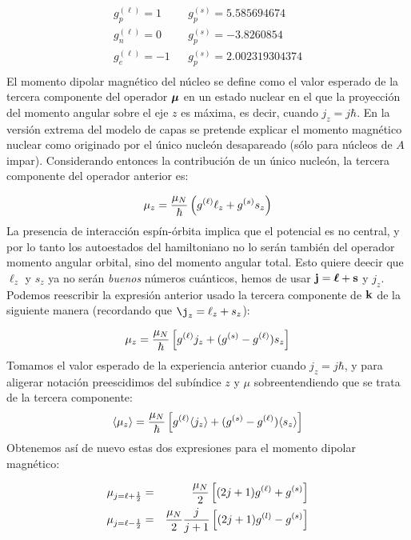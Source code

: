 \begin{eqnarray}
	g_p^{(\ell)} = 1 & & g_p^{(s)} = \num{5.585694674} \\
	g_n^{(\ell)} = 0 & & g_p^{(s)} = \num{-3.8260854} \\
	g_e^{(\ell)} = -1 & & g_p^{(s)} = \num{2.002319304374} \\
\end{eqnarray}
El momento dipolar magnético del núcleo se define como el valor esperado de la tercera componente del operador $\boldsymbol{\mu}$ en un estado nuclear en el que la proyección del momento angular sobre el eje $z$ es máxima, es decir, cuando $j_z=j\hbar$. En la versión extrema del modelo de capas se pretende explicar el momento magnético nuclear como originado por el único nucleón desapareado (sólo para núcleos de $A$ impar). Considerando entonces la contribución de un único nucleón, la tercera componente del operador anterior es:

\begin{eqnarray}
	\mu_z = \frac{\mu_N}{\hbar} \left( g^{(\ell)} \ell_z + g^{(s)} s_z \right)
\end{eqnarray}
La presencia de interacción espín-órbita implica que el potencial es no central, y por lo tanto los autoestados del hamiltoniano no lo serán también del operador momento angular orbital, sino del momento angular total. Esto quiere deecir que $\ell_z$ y $s_z$ ya no serán \textit{buenos} números cuánticos, hemos de usar $\mathbf{j}=\boldsymbol{\ell}+\mathbf{s}$ y $j_z$. Podemos reescribir la expresión anterior usado la tercera componente de $\mathbf{k}$ de la siguiente manera (recordando que $\j_z=\ell_z + s_z$):

\begin{eqnarray}
	\mu_z = \frac{\mu_N}{\hbar} \left[ g^{(\ell)}j_z + (g^{(s)}-g^{(\ell)})  s_z \right]
\end{eqnarray}
Tomamos el valor esperado de la experiencia anterior cuando $j_z=j\hbar$, y para aligerar notación preescidimos del subíndice $z$ y $\mu$ sobreentendiendo que se trata de la tercera componente:
\begin{eqnarray}
	\langle \mu_z \rangle = \frac{\mu_N}{\hbar} \left[ g^{(\ell)} \langle j_z \rangle + (g^{(s)}-g^{(\ell)}) \langle s_z \rangle \right]
\end{eqnarray}
Obtenemos así de nuevo estas dos expresiones para el momento dipolar magnético:

\begin{eqnarray}
	\mu_{j=\ell+\frac{1}{2}} & = & \frac{\mu_N}{2} \left[ (2j+1)g^{(\ell)} + g^{(s)} \right] \\
	\mu_{j=\ell-\frac{1}{2}} & = & \frac{\mu_N}{2} \frac{j}{j+1} \left[ (2j+1)g^{(l)} - g^{(s)}  \right]
\end{eqnarray}

